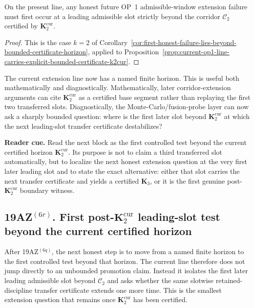 \begin{corollary}
\label{cor:first-uncertified-op1-slot-lies-strictly-beyond-k2cur}
On the present line, any honest future OP~1 admissible-window extension failure must first occur at a leading admissible slot strictly beyond the corridor $\mathcal C_2$ certified by $\mathbf K_2^{\mathrm{cur}}$.
\end{corollary}

\begin{proof}
This is the case $k=2$ of Corollary~\ref{cor:first-honest-failure-lies-beyond-bounded-certificate-horizon}, applied to Proposition~\ref{prop:current-op1-line-carries-explicit-bounded-certificate-k2cur}.
\end{proof}

\begin{remark}
\label{rem:what-explicit-certificate-k2cur-now-buys}
The current extension line now has a named finite horizon. This is useful both mathematically and diagnostically. Mathematically, later corridor-extension arguments can cite $\mathbf K_2^{\mathrm{cur}}$ as a certified base segment rather than replaying the first two transferred slots. Diagnostically, the Monte-Carlo/fusion-probe layer can now ask a sharply bounded question: where is the first later slot beyond $\mathbf K_2^{\mathrm{cur}}$ at which the next leading-slot transfer certificate destabilizes?
\end{remark}


\noindent\textbf{Reader cue.} Read the next block as the first controlled test beyond the current certified horizon $\mathbf K_2^{\mathrm{cur}}$. Its purpose is not to claim a third transferred slot automatically, but to localize the next honest extension question at the very first later leading slot and to state the exact alternative: either that slot carries the next transfer certificate and yields a certified $\mathbf K_3$, or it is the first genuine post-$\mathbf K_2^{\mathrm{cur}}$ boundary witness.

\subsection*{19AZ$^{(6r)}$. First post-$\mathbf K_2^{\mathrm{cur}}$ leading-slot test beyond the current certified horizon}
\label{sec:first-post-k2-leading-slot-test-beyond-current-certified-horizon}
After 19AZ$^{(6q)}$, the next honest step is to move from a named finite horizon to the first controlled test beyond that horizon. The current line therefore does not jump directly to an unbounded promotion claim. Instead it isolates the first later leading admissible slot beyond $\mathcal C_2$ and asks whether the same slotwise retained-discipline transfer certificate extends one more time. This is the smallest extension question that remains once $\mathbf K_2^{\mathrm{cur}}$ has been certified.

